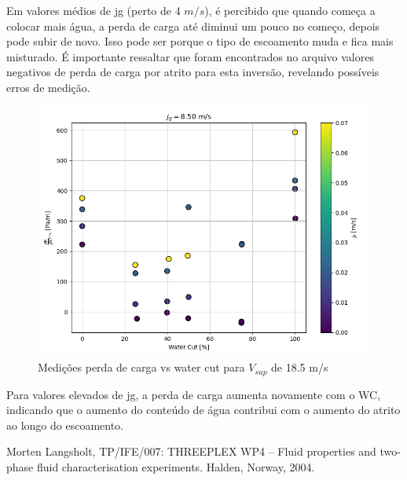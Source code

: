 \documentclass[12pt]{article}
\begin{document}
Em valores médios de jg (perto de 4 $m/s$), é percibido que quando começa a colocar mais água, a perda de carga até diminui um pouco no começo, depois pode subir de novo. Isso pode ser porque o tipo de escoamento muda e fica mais misturado. É importante ressaltar que foram encontrados no arquivo valores negativos de perda de carga por atrito para esta inversão, revelando possíveis erros de medição.


\begin{figure}[H]
	\centering
	\includegraphics[width=.65\textwidth]{figures/6}
	\caption{Medições perda de carga vs water cut para $V_{sup}$ de 18.5 m/s}
\end{figure}


Para valores elevados de jg, a perda de carga aumenta novamente com o WC, indicando que o aumento do conteúdo de água contribui com o aumento do atrito ao longo do escoamento.

\begin{thebibliography}{999}
	
	
	Morten Langsholt,
	TP/IFE/007: THREEPLEX WP4 – Fluid properties and
	two-phase fluid characterisation experiments.
	Halden, Norway,
	2004.
	
	
	
\end{thebibliography}
\end{document}
